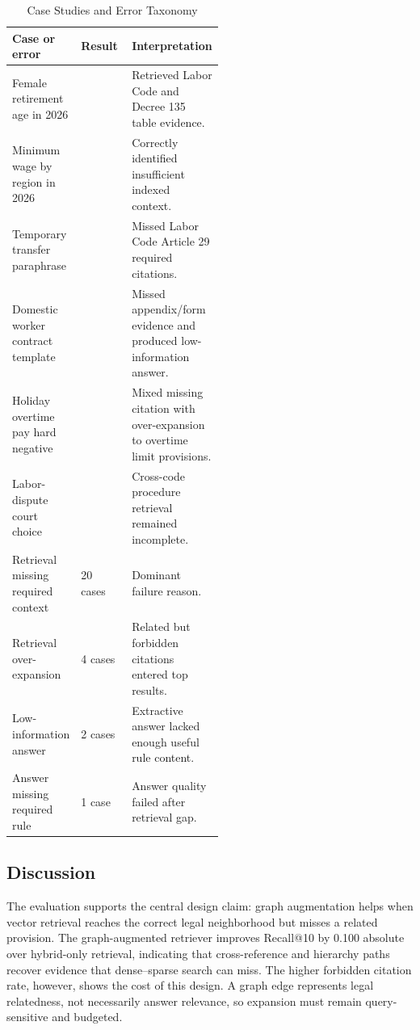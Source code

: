 \begin{table}[H]
  \centering
  \caption{Case Studies and Error Taxonomy}
  \label{tab:error-taxonomy-draft}
  \begin{tabularx}{\linewidth}{@{}L{0.28\linewidth}L{0.24\linewidth}Y@{}}
    \toprule
    Case or error & Result & Interpretation \\
    \midrule
    Female retirement age in 2026 &  & Retrieved Labor Code and Decree 135 table evidence. \\
    Minimum wage by region in 2026 &  & Correctly identified insufficient indexed context. \\
    Temporary transfer paraphrase &  & Missed Labor Code Article 29 required citations. \\
    Domestic worker contract template &  & Missed appendix/form evidence and produced low-information answer. \\
    Holiday overtime pay hard negative &  & Mixed missing citation with over-expansion to overtime limit provisions. \\
    Labor-dispute court choice &  & Cross-code procedure retrieval remained incomplete. \\
    \midrule
    Retrieval missing required context & 20 cases & Dominant failure reason. \\
    Retrieval over-expansion & 4 cases & Related but forbidden citations entered top results. \\
    Low-information answer & 2 cases & Extractive answer lacked enough useful rule content. \\
    Answer missing required rule & 1 case & Answer quality failed after retrieval gap. \\
    \bottomrule
  \end{tabularx}
\end{table}

\subsection{Discussion}
The evaluation supports the central design claim: graph augmentation helps when vector retrieval reaches the correct legal neighborhood but misses a related provision. The graph-augmented retriever improves Recall@10 by 0.100 absolute over hybrid-only retrieval, indicating that cross-reference and hierarchy paths recover evidence that dense--sparse search can miss. The higher forbidden citation rate, however, shows the cost of this design. A graph edge represents legal relatedness, not necessarily answer relevance, so expansion must remain query-sensitive and budgeted.


